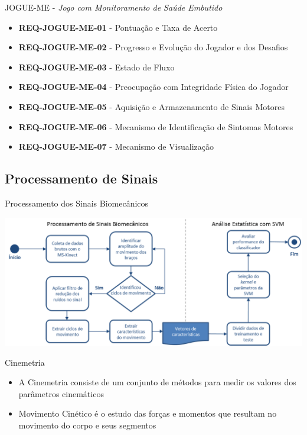 \documentclass{beamer}
\begin{document}
\begin{frame}{JOGUE-ME - \textit{Jogo com Monitoramento de Saúde Embutido}}
	\begin{block}{}
		\begin{itemize}
			\item	\textbf{REQ-JOGUE-ME-01} - Pontuação e Taxa de Acerto
			\item	\textbf{REQ-JOGUE-ME-02} - Progresso e Evolução do Jogador e dos Desafios
			\item	\textbf{REQ-JOGUE-ME-03} - Estado de Fluxo
			\item	\textbf{REQ-JOGUE-ME-04} - Preocupação com Integridade Física do Jogador
			\item	\textbf{REQ-JOGUE-ME-05} - Aquisição e Armazenamento de Sinais Motores
			\item	\textbf{REQ-JOGUE-ME-06} - Mecanismo de Identificação de Sintomas Motores
			\item	\textbf{REQ-JOGUE-ME-07} - Mecanismo de Visualização
		\end{itemize}
	\end{block}
\end{frame}

\subsection{Processamento de Sinais}
\begin{frame}{Processamento dos Sinais Biomecânicos}
  
      \left \includegraphics[height=1.9 in]{img/biomecprocessorh.png}
  
\end{frame}


\begin{frame}{Cinemetria}
  \begin{block}{}
      \begin{itemize}
	 \item A Cinemetria consiste de um conjunto de métodos para medir os valores dos parâmetros cinemáticos
	 \item Movimento Cinético é o estudo das forças e momentos que resultam no movimento do corpo e seus segmentos
       \end{itemize}
  \end{block}
\end{frame}
\end{document}
